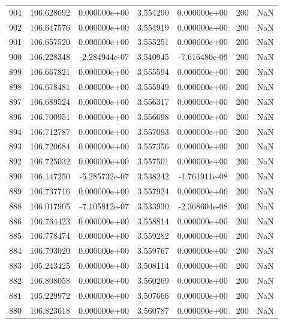 \begin{tabular}{rrrrrrr}
 904 & 106.628692 &  0.000000e+00 &  3.554290 &  0.000000e+00 &         200 & NaN \\
 902 & 106.647576 &  0.000000e+00 &  3.554919 &  0.000000e+00 &         200 & NaN \\
 901 & 106.657520 &  0.000000e+00 &  3.555251 &  0.000000e+00 &         200 & NaN \\
 900 & 106.228348 & -2.284944e-07 &  3.540945 & -7.616480e-09 &         200 & NaN \\
 899 & 106.667821 &  0.000000e+00 &  3.555594 &  0.000000e+00 &         200 & NaN \\
 898 & 106.678481 &  0.000000e+00 &  3.555949 &  0.000000e+00 &         200 & NaN \\
 897 & 106.689524 &  0.000000e+00 &  3.556317 &  0.000000e+00 &         200 & NaN \\
 896 & 106.700951 &  0.000000e+00 &  3.556698 &  0.000000e+00 &         200 & NaN \\
 894 & 106.712787 &  0.000000e+00 &  3.557093 &  0.000000e+00 &         200 & NaN \\
 893 & 106.720684 &  0.000000e+00 &  3.557356 &  0.000000e+00 &         200 & NaN \\
 892 & 106.725032 &  0.000000e+00 &  3.557501 &  0.000000e+00 &         200 & NaN \\
 890 & 106.147250 & -5.285732e-07 &  3.538242 & -1.761911e-08 &         200 & NaN \\
 889 & 106.737716 &  0.000000e+00 &  3.557924 &  0.000000e+00 &         200 & NaN \\
 888 & 106.017905 & -7.105812e-07 &  3.533930 & -2.368604e-08 &         200 & NaN \\
 886 & 106.764423 &  0.000000e+00 &  3.558814 &  0.000000e+00 &         200 & NaN \\
 885 & 106.778474 &  0.000000e+00 &  3.559282 &  0.000000e+00 &         200 & NaN \\
 884 & 106.793020 &  0.000000e+00 &  3.559767 &  0.000000e+00 &         200 & NaN \\
 883 & 105.243425 &  0.000000e+00 &  3.508114 &  0.000000e+00 &         200 & NaN \\
 882 & 106.808058 &  0.000000e+00 &  3.560269 &  0.000000e+00 &         200 & NaN \\
 881 & 105.229972 &  0.000000e+00 &  3.507666 &  0.000000e+00 &         200 & NaN \\
 880 & 106.823618 &  0.000000e+00 &  3.560787 &  0.000000e+00 &         200 & NaN \\

\end{tabular}
